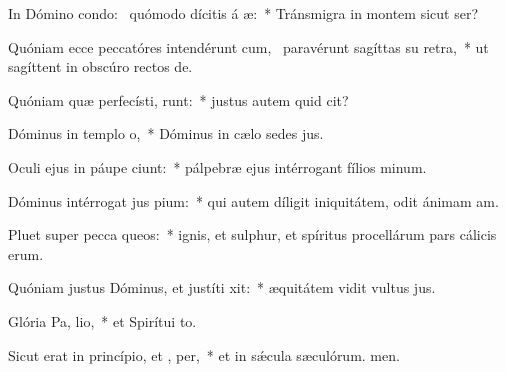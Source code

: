 \item In Dómino condo:~\pscross{} quómodo dícitis á æ:~* Tránsmigra in montem sicut ser?
\item Quóniam ecce peccatóres intendérunt cum,~\pscross{} paravérunt sagíttas su  retra,~* ut sagíttent in obscúro rectos de.
\item Quóniam quæ perfecísti, runt:~* justus autem quid cit?
\item Dóminus in templo  o,~* Dóminus in cælo sedes jus.
\item Oculi ejus in páupe ciunt:~* pálpebræ ejus intérrogant fílios minum.
\item Dóminus intérrogat jus  pium:~* qui autem díligit iniquitátem, odit ánimam am.
\item Pluet super pecca queos:~* ignis, et sulphur, et spíritus procellárum pars cálicis erum.
\item Quóniam justus Dóminus, et justíti xit:~* æquitátem vidit vultus jus.
\item Glória Pa,  lio,~* et Spirítui to.
\item Sicut erat in princípio, et ,  per,~* et in sǽcula sæculórum. men.
